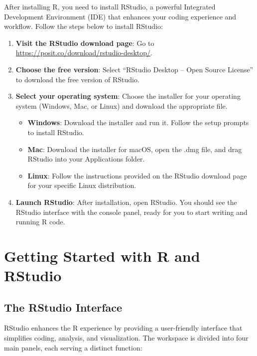 \documentclass[
]{book}
\providecommand{\tightlist}{%
  \setlength{\itemsep}{0pt}\setlength{\parskip}{0pt}}
\begin{document}
After installing R, you need to install RStudio, a powerful Integrated Development Environment (IDE) that enhances your coding experience and workflow. Follow the steps below to install RStudio:

\begin{enumerate}
\def\labelenumi{\arabic{enumi}.}
\tightlist
\item
  \textbf{Visit the RStudio download page}: Go to \url{https://posit.co/download/rstudio-desktop/}.
\item
  \textbf{Choose the free version}: Select ``RStudio Desktop -- Open Source License'' to download the free version of RStudio.
\item
  \textbf{Select your operating system}: Choose the installer for your operating system (Windows, Mac, or Linux) and download the appropriate file.

  \begin{itemize}
  \tightlist
  \item
    \textbf{Windows}: Download the installer and run it. Follow the setup prompts to install RStudio.
  \item
    \textbf{Mac}: Download the installer for macOS, open the .dmg file, and drag RStudio into your Applications folder.
  \item
    \textbf{Linux}: Follow the instructions provided on the RStudio download page for your specific Linux distribution.
  \end{itemize}
\item
  \textbf{Launch RStudio}: After installation, open RStudio. You should see the RStudio interface with the console panel, ready for you to start writing and running R code.
\end{enumerate}

\section{Getting Started with R and RStudio}\label{getting-started-with-r-and-rstudio}

\subsection*{The RStudio Interface}\label{the-rstudio-interface}

RStudio enhances the R experience by providing a user-friendly interface that simplifies coding, analysis, and visualization. The workspace is divided into four main panels, each serving a distinct function:
\end{document}
